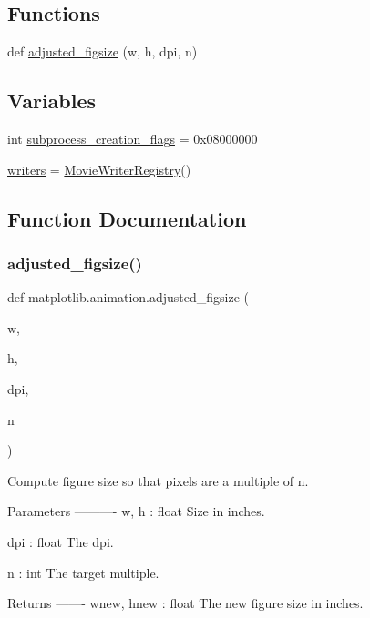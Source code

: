\subsection*{Functions}
\begin{DoxyCompactItemize}
\item 
def \hyperlink{namespacematplotlib_1_1animation_afd393479d1807eeb4976bb66621c3c37}{adjusted\+\_\+figsize} (w, h, dpi, n)
\end{DoxyCompactItemize}
\subsection*{Variables}
\begin{DoxyCompactItemize}
\item 
int \hyperlink{namespacematplotlib_1_1animation_a362b6019e59acf2acd3ac937a9cc4efe}{subprocess\+\_\+creation\+\_\+flags} = 0x08000000
\item 
\hyperlink{namespacematplotlib_1_1animation_a76fe2bdd57246f2d5fbdcfe9cce770ef}{writers} = \hyperlink{classmatplotlib_1_1animation_1_1MovieWriterRegistry}{Movie\+Writer\+Registry}()
\end{DoxyCompactItemize}


\subsection{Function Documentation}
\mbox{\label{namespacematplotlib_1_1animation_afd393479d1807eeb4976bb66621c3c37}} 
\subsubsection{\texorpdfstring{adjusted\+\_\+figsize()}{adjusted\_figsize()}}
{\footnotesize\ttfamily def matplotlib.\+animation.\+adjusted\+\_\+figsize (\begin{DoxyParamCaption}\item[{}]{w,  }\item[{}]{h,  }\item[{}]{dpi,  }\item[{}]{n }\end{DoxyParamCaption})}

\begin{DoxyVerb}Compute figure size so that pixels are a multiple of n.

Parameters
----------
w, h : float
    Size in inches.

dpi : float
    The dpi.

n : int
    The target multiple.

Returns
-------
wnew, hnew : float
    The new figure size in inches.
\end{DoxyVerb}
 

